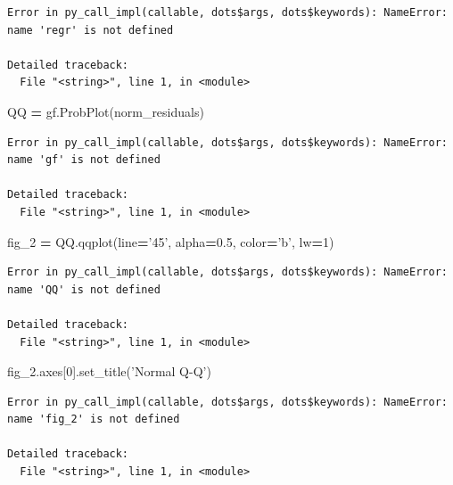 \documentclass[]{book}
\newenvironment{Shaded}{\begin{snugshade}}{\end{snugshade}}
\newcommand{\DecValTok}[1]{\textcolor[rgb]{0.00,0.00,0.81}{#1}}
\newcommand{\FloatTok}[1]{\textcolor[rgb]{0.00,0.00,0.81}{#1}}
\newcommand{\NormalTok}[1]{#1}
\newcommand{\OperatorTok}[1]{\textcolor[rgb]{0.81,0.36,0.00}{\textbf{#1}}}
\newcommand{\StringTok}[1]{\textcolor[rgb]{0.31,0.60,0.02}{#1}}
\begin{document}
\begin{verbatim}
Error in py_call_impl(callable, dots$args, dots$keywords): NameError: name 'regr' is not defined

Detailed traceback: 
  File "<string>", line 1, in <module>
\end{verbatim}

\begin{Shaded}
\begin{Highlighting}[]
\NormalTok{QQ }\OperatorTok{=}\NormalTok{ gf.ProbPlot(norm_residuals)}
\end{Highlighting}
\end{Shaded}

\begin{verbatim}
Error in py_call_impl(callable, dots$args, dots$keywords): NameError: name 'gf' is not defined

Detailed traceback: 
  File "<string>", line 1, in <module>
\end{verbatim}

\begin{Shaded}
\begin{Highlighting}[]
\NormalTok{fig_2 }\OperatorTok{=}\NormalTok{ QQ.qqplot(line}\OperatorTok{=}\StringTok{'45'}\NormalTok{, alpha}\OperatorTok{=}\FloatTok{0.5}\NormalTok{, color}\OperatorTok{=}\StringTok{'b'}\NormalTok{, lw}\OperatorTok{=}\DecValTok{1}\NormalTok{)}
\end{Highlighting}
\end{Shaded}

\begin{verbatim}
Error in py_call_impl(callable, dots$args, dots$keywords): NameError: name 'QQ' is not defined

Detailed traceback: 
  File "<string>", line 1, in <module>
\end{verbatim}

\begin{Shaded}
\begin{Highlighting}[]
\NormalTok{fig_2.axes[}\DecValTok{0}\NormalTok{].set_title(}\StringTok{'Normal Q-Q'}\NormalTok{)}
\end{Highlighting}
\end{Shaded}

\begin{verbatim}
Error in py_call_impl(callable, dots$args, dots$keywords): NameError: name 'fig_2' is not defined

Detailed traceback: 
  File "<string>", line 1, in <module>
\end{verbatim}
\end{document}
